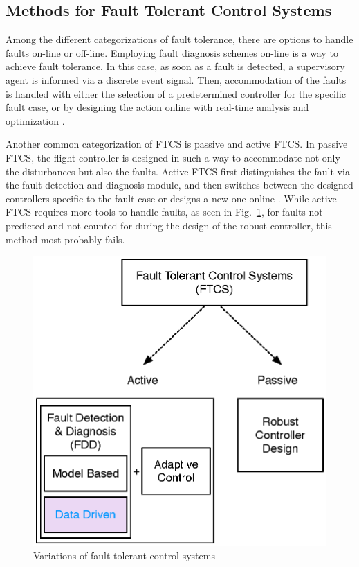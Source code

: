 \subsection{Methods for Fault Tolerant Control Systems}\label{ch1:methodsFTCS}

Among the different categorizations of fault tolerance, there are options to handle 
faults on-line or off-line. Employing fault diagnosis schemes on-line is a way to 
achieve fault tolerance. In this case, as soon as a fault is detected, a supervisory 
agent is informed via a discrete event signal. Then, accommodation of the faults 
is handled with either the selection of a predetermined controller for the specific 
fault case, or by designing the action online with real-time analysis and optimization \cite{blanke2000fault}.

Another common categorization of FTCS is passive and active FTCS. In passive FTCS, 
the flight controller is designed in such a way to accommodate not only the 
disturbances but also the faults. Active FTCS first distinguishes the fault via the fault detection 
and diagnosis module, and then switches between the designed controllers specific to the 
fault case or designs a new one online \cite{angelov2012sense}. While active FTCS 
requires more tools to handle faults, as seen in Fig.~\ref{fig:FTCS}, for faults 
not predicted and not counted for during the design of the robust controller, this method 
most probably fails. 

\begin{figure}
\begin{center}
\includegraphics[width=11.3cm]{figures/FTCS}
\caption{Variations of fault tolerant control systems } 
\label{fig:FTCS}
\end{center}
\end{figure}



